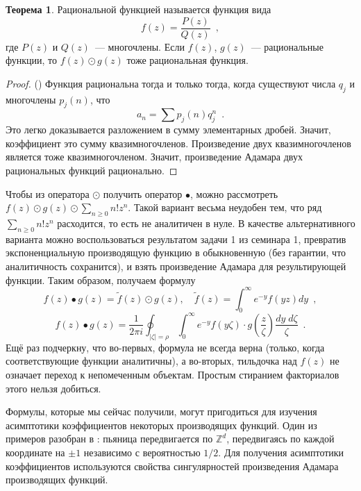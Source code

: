 \documentclass{article}
\theoremstyle{definition}
\newtheorem*{theorem}{Теорема}
\begin{document}
\begin{theorem}
    Рациональной функцией называется функция вида
\[
    f(z) = \dfrac{P(z)}{Q(z)} \enspace ,
\] 
где \( P(z) \) и \( Q(z) \)~--- многочлены. Если \( f(z) \), \( g(z) \)~---
рациональные функции, то \( f(z) \odot g(z) \) тоже рациональная функция.
\end{theorem}
\begin{proof}({\cite{lando}})
	Функция рациональна тогда и только тогда, когда существуют числа \( q_j \) и 
	многочлены \( p_j(n) \), что
	\[
		a_n = \sum p_j(n)q_j^n \enspace .
	\]
    Это легко доказывается разложением в сумму элементарных дробей. Значит,
коэффициент это сумму квазимногочленов.
	Произведение двух квазимногочленов является тоже квазимногочленом. Значит,
произведение Адамара двух рациональных функций рационально.
\end{proof}

Чтобы из оператора \( \odot \) получить оператор \( \bullet \), можно
рассмотреть \( f(z) \odot g(z) \odot \sum_{n \geq 0} n! z^n \). Такой вариант
весьма неудобен тем, что ряд \( \sum_{n \geq 0} n! z^n \) расходится, то есть не
аналитичен в нуле. В качестве альтернативного варианта можно воспользоваться
результатом задачи 1 из семинара 1, превратив экспоненциальную производящую
функцию в обыкновенную (без гарантии, что аналитичность сохранится), и взять
произведение Адамара для результирующей функции. Таким образом, получаем формулу
\[
    f(z) \bullet g(z) = \widetilde f(z) \odot g(z), \quad
    \widetilde f(z) = \int_{0}^\infty e^{-y} f(yz) dy \enspace ,
\]
\[
    f(z) \bullet g(z) = \dfrac{1}{2\pi i} \oint_{|\zeta| = \rho}
    \int_{0}^\infty e^{-y} f(y \zeta) \cdot g \left(\dfrac{z}{\zeta} \right)
\dfrac{dy\; d \zeta}{\zeta}
\enspace .
\]
Ещё раз подчеркну, что во-первых, формула не всегда верна (только, когда
соответствующие функции аналитичны), а во-вторых, тильдочка над \( f(z) \) не
означает переход к непомеченным объектам. Простым стиранием факториалов этого
нельзя добиться.

Формулы, которые мы сейчас получили, могут пригодиться для изучения асимптотики
коэффициентов некоторых производящих функций. Один из примеров разобран в
\cite[Example VI.14, page 425]{AC}: пьяница передвигается по \( \mathbb Z^d \),
передвигаясь по каждой координате на \( \pm 1 \) независимо с вероятностью \(
1/2 \). Для получения асимптотики коэффициентов используются свойства
сингулярностей произведения Адамара производящих функций.
\end{document}
